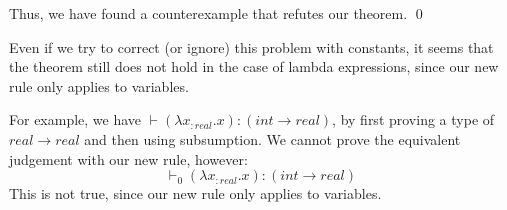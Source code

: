 \documentclass{article}
\newcommand{\proves}{\vdash}
\begin{document}
Thus, we have found a counterexample that refutes our theorem.  \qed

\medskip

Even if we try to correct (or ignore) this problem with constants, it seems
that the theorem still does not hold in the case of lambda expressions,
since our new rule only applies to variables.

For example, we have $\proves (\lambda x_{:real} . x) : (int \to real)$,
by first proving a type of $real \to real$ and then using subsumption.
We cannot prove the equivalent judgement with our new rule, however:
\[\proves_0 (\lambda x_{:real}. x) : (int \to real)\]
This is not true, since our new rule only applies to variables.
\end{document}
